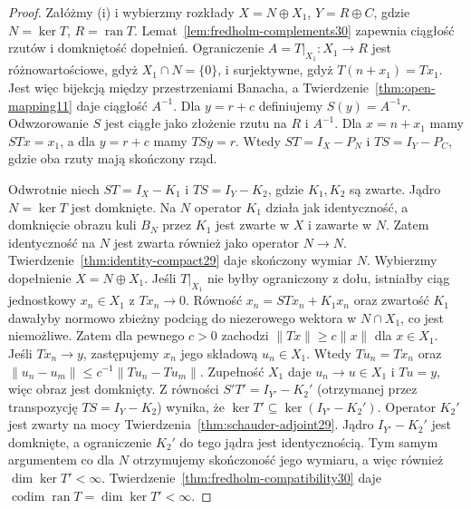 \begin{proof}
Załóżmy (i) i wybierzmy rozkłady $X=N\oplus X_1$,
$Y=R\oplus C$, gdzie $N=\ker T$, $R=\operatorname{ran}T$.
Lemat~\ref{lem:fredholm-complements30} zapewnia ciągłość
rzutów i domkniętość dopełnień. Ograniczenie
$A=T|_{X_1}:X_1\to R$ jest różnowartościowe, gdyż
$X_1\cap N=\{0\}$, i surjektywne, gdyż $T(n+x_1)=Tx_1$.
Jest więc bijekcją między przestrzeniami Banacha, a
Twierdzenie~\ref{thm:open-mapping11} daje ciągłość $A^{-1}$.
Dla $y=r+c$ definiujemy $S(y)=A^{-1}r$.
Odwzorowanie $S$ jest ciągłe jako złożenie rzutu na $R$
i $A^{-1}$. Dla $x=n+x_1$ mamy $STx=x_1$, a dla
$y=r+c$ mamy $TSy=r$. Wtedy $ST=I_X-P_N$ i $TS=I_Y-P_C$, gdzie oba rzuty
mają skończony rząd.

Odwrotnie niech $ST=I_X-K_1$ i $TS=I_Y-K_2$,
gdzie $K_1,K_2$ są zwarte. Jądro $N=\ker T$ jest domknięte. Na $N$ operator
$K_1$ działa jak identyczność, a domknięcie obrazu kuli
$B_N$ przez $K_1$ jest zwarte w $X$ i zawarte w $N$.
Zatem identyczność na $N$ jest zwarta również jako
operator $N\to N$. Twierdzenie~\ref{thm:identity-compact29}
daje skończony wymiar $N$.
Wybierzmy dopełnienie $X=N\oplus X_1$.
Jeśli $T|_{X_1}$ nie byłby ograniczony z dołu, istniałby
ciąg jednostkowy $x_n\in X_1$ z $Tx_n\to0$.
Równość $x_n=STx_n+K_1x_n$ oraz zwartość $K_1$
dawałyby normowo zbieżny podciąg do niezerowego wektora
w $N\cap X_1$, co jest niemożliwe. Zatem dla pewnego $c>0$ zachodzi $\|Tx\|\ge c\|x\|$
dla $x\in X_1$. Jeśli $Tx_n\to y$, zastępujemy $x_n$
jego składową $u_n\in X_1$. Wtedy $Tu_n=Tx_n$ oraz
$\|u_n-u_m\|\le c^{-1}\|Tu_n-Tu_m\|$. Zupełność $X_1$
daje $u_n\to u\in X_1$ i $Tu=y$, więc obraz jest domknięty.
Z równości $S'T'=I_{Y'}-K_2'$ (otrzymanej przez
transpozycję $TS=I_Y-K_2$) wynika, że
$\ker T'\subseteq\ker(I_{Y'}-K_2')$.
Operator $K_2'$ jest zwarty na mocy
Twierdzenia~\ref{thm:schauder-adjoint29}. Jądro
$I_{Y'}-K_2'$ jest domknięte, a ograniczenie $K_2'$
do tego jądra jest identycznością. Tym samym argumentem
co dla $N$ otrzymujemy skończoność jego wymiaru,
a więc również $\dim\ker T'<\infty$.
Twierdzenie~\ref{thm:fredholm-compatibility30} daje
$\operatorname{codim}\operatorname{ran}T=\dim\ker T'<\infty$.
\end{proof}


